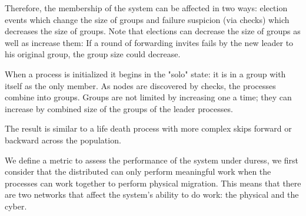 Therefore, the membership of the system can be affected in two ways: election 
events which change the size of groups and failure suspicion (via checks) which 
decreases the size of groups. Note that elections can decrease the size of 
groups as well as increase them: If a round of forwarding invites fails by the 
new leader to his original group, the group size could decrease.

When a process is initialized it begins in the "solo" state: it is in a group 
with itself as the only member. As nodes are discovered by checks, the 
processes combine into groups. Groups are not limited by increasing one a time; 
they can increase by combined size of the groups of the leader processes.

The result is similar to a life death process with more complex skips forward 
or backward across the population.

We define a metric to assess the performance of the system under duress, we 
first consider that the distributed can only perform meaningful work when the 
processes can work together to perform physical migration. This means that 
there are two networks that affect the system's ability to do work: the 
physical and the cyber.
